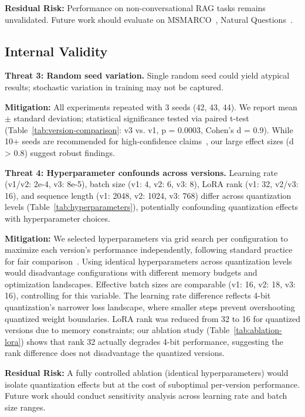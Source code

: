 \documentclass[pdflatex,sn-basic]{sn-jnl}
\begin{document}
\noindent
\textbf{Residual Risk:} 
Performance on non-conversational RAG tasks remains unvalidated. Future work should evaluate on MSMARCO~\citep{bajaj2016msmarco}, Natural Questions~\citep{kwiatkowski2019natural}.

\subsection{Internal Validity}
\label{sec:threats-internal}

\noindent
\textbf{Threat 3: Random seed variation.} 
Single random seed could yield atypical results; stochastic variation in training may not be captured.

\noindent
\textbf{Mitigation:} 
All experiments repeated with 3 seeds (42, 43, 44). We report mean $\pm$ standard deviation; statistical significance tested via paired t-test (Table~\ref{tab:version-comparison}: v3 vs. v1, p = 0.0003, Cohen's d = 0.9). While 10+ seeds are recommended for high-confidence claims~\citep{henderson2018deep}, our large effect sizes (d > 0.8) suggest robust findings.

\noindent
\textbf{Threat 4: Hyperparameter confounds across versions.}
Learning rate (v1/v2: 2e-4, v3: 8e-5), batch size (v1: 4, v2: 6, v3: 8), LoRA rank (v1: 32, v2/v3: 16), and sequence length (v1: 2048, v2: 1024, v3: 768) differ across quantization levels (Table~\ref{tab:hyperparameters}), potentially confounding quantization effects with hyperparameter choices.

\noindent
\textbf{Mitigation:}
We selected hyperparameters via grid search per configuration to maximize each version's performance independently, following standard practice for fair comparison~\citep{dettmers2023qlora}. Using identical hyperparameters across quantization levels would disadvantage configurations with different memory budgets and optimization landscapes. Effective batch sizes are comparable (v1: 16, v2: 18, v3: 16), controlling for this variable. The learning rate difference reflects 4-bit quantization's narrower loss landscape, where smaller steps prevent overshooting quantized weight boundaries. LoRA rank was reduced from 32 to 16 for quantized versions due to memory constraints; our ablation study (Table~\ref{tab:ablation-lora}) shows that rank 32 actually degrades 4-bit performance, suggesting the rank difference does not disadvantage the quantized versions.

\noindent
\textbf{Residual Risk:}
A fully controlled ablation (identical hyperparameters) would isolate quantization effects but at the cost of suboptimal per-version performance. Future work should conduct sensitivity analysis across learning rate and batch size ranges.
\end{document}
